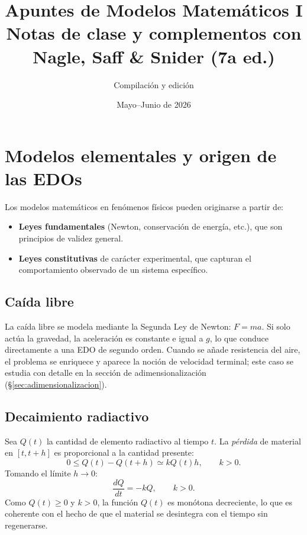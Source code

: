 \documentclass[11pt,letterpaper]{article}
\title{\textbf{Apuntes de Modelos Matemáticos I}\\[4pt]
       \large Notas de clase y complementos con Nagle, Saff \& Snider (7a ed.)}
\author{Compilación y edición}
\date{Mayo--Junio de 2026}
\begin{document}
\maketitle

\tableofcontents
\newpage

\section{Modelos elementales y origen de las EDOs}

Los modelos matemáticos en fenómenos físicos pueden originarse a partir de:
\begin{itemize}
    \item \textbf{Leyes fundamentales} (Newton, conservación de energía, etc.),
          que son principios de validez general.
    \item \textbf{Leyes constitutivas} de carácter experimental, que capturan el
          comportamiento observado de un sistema específico.
\end{itemize}

\subsection{Caída libre}

La caída libre se modela mediante la Segunda Ley de Newton: $F=ma$. Si solo
actúa la gravedad, la aceleración es constante e igual a $g$, lo que conduce
directamente a una EDO de segundo orden. Cuando se añade resistencia del aire,
el problema se enriquece y aparece la noción de velocidad terminal; este caso
se estudia con detalle en la sección de adimensionalización
(§\ref{sec:adimensionalizacion}).

\subsection{Decaimiento radiactivo}

Sea $Q(t)$ la cantidad de elemento radiactivo al tiempo $t$. La \emph{pérdida}
de material en $[t,t+h]$ es proporcional a la cantidad presente:
\[
0\leq Q(t)-Q(t+h)\simeq kQ(t)h,\qquad k>0.
\]
Tomando el límite $h\to 0$:
\[
\boxed{\frac{dQ}{dt}=-kQ,\qquad k>0.}
\]
Como $Q(t)\geq 0$ y $k>0$, la función $Q(t)$ es monótona decreciente, lo que es
coherente con el hecho de que el material se desintegra con el tiempo sin regenerarse.
\end{document}
